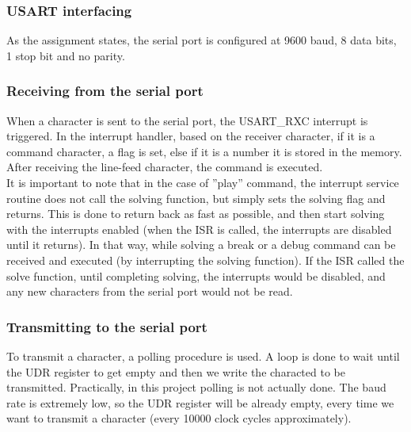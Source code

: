 \documentclass[12pt, a4, hidelinks]{article}
\begin{document}
\subsubsection*{USART interfacing}
As the assignment states, the serial port is configured at 9600 baud, 8 data bits, 1 stop bit and no parity.
\subsubsection*{Receiving from the serial port}
When a character is sent to the serial port, the USART\_RXC interrupt is triggered. In the interrupt handler, based on the receiver character, if it is a command character, a flag is set, else if it is a number it is stored in the memory. After receiving the line-feed character, the command is executed. \\
It is important to note that in the case of ''play'' command, the interrupt service routine does not call the solving function, but simply sets the solving flag and returns. This is done to return back as fast as possible, and then start solving with the interrupts enabled (when the ISR is called, the interrupts are disabled until it returns). In that way, while solving a break or a debug command can be received and executed (by interrupting the solving function). If the ISR called the solve function, until completing solving, the interrupts would be disabled, and any new characters from the serial port would not be read.

\subsubsection*{Transmitting to the serial port}
To transmit a character, a polling procedure is used. A loop is done to wait until the UDR register to get empty and then we write the characted to be transmitted. Practically, in this project polling is not actually done. The baud rate is extremely low, so the UDR register will be already empty, every time we want to transmit a character (every 10000 clock cycles approximately).
\end{document}
